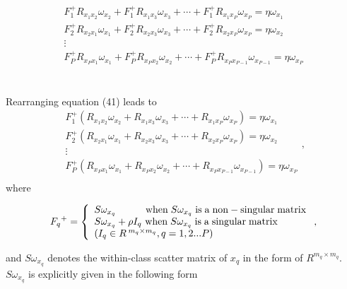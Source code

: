 \documentclass[journal]{IEEEtran}
\begin{document}
\begin{small}
\begin{equation}
\begin{array}{*{20}{c}}
   {F_1^ + {R_{{x_1}{x_2}}}{\omega _{{x_2}}} + F_1^ + {R_{{x_1}{x_3}}}{\omega _{{x_3}}} +  \cdots  + F_1^ + {R_{{x_1}{x_P}}}{\omega _{{x_P}}} = {\eta}{\omega _{{x_1}}}}  \\
   {F_2^ + {R_{{x_2}{x_1}}}{\omega _{{x_1}}} + F_2^ + {R_{{x_2}{x_3}}}{\omega _{{x_3}}} +  \cdots  + F_2^ + {R_{{x_2}{x_P}}}{\omega _{{x_P}}} = {\eta}{\omega _{{x_2}}}}  \\
    \vdots   \\
   {F_P^ + {R_{{x_P}{x_1}}}{\omega _{{x_1}}} + F_P^ + {R_{{x_P}{x_2}}}{\omega _{{x_2}}} +  \cdots  + F_P^ + {R_{{x_P}{x_{P - 1}}}}{\omega _{{x_{P - 1}}}} = {\eta}{\omega _{{x_P}}}}  \\
\end{array}
\end{equation}
\end{small}\\\indent
Rearranging equation (41) leads to
\begin{equation}
\begin{array}{*{20}{c}}
   {F_1^ + ({R_{{x_1}{x_2}}}{\omega _{{x_2}}} + {R_{{x_1}{x_3}}}{\omega _{{x_3}}} +  \cdots  + {R_{{x_1}{x_P}}}{\omega _{{x_P}}}) = {\eta}{\omega _{{x_1}}}}  \\
   {F_2^ + ({R_{{x_2}{x_1}}}{\omega _{{x_1}}} + {R_{{x_2}{x_3}}}{\omega _{{x_3}}} +  \cdots  + {R_{{x_2}{x_P}}}{\omega _{{x_P}}}) = {\eta}{\omega _{{x_2}}}}  \\
    \vdots   \\
   {F_P^ + ({R_{{x_P}{x_1}}}{\omega _{{x_1}}} + {R_{{x_P}{x_2}}}{\omega _{{x_2}}} +  \cdots  + {R_{{x_P}{x_{P - 1}}}}{\omega _{{x_{P - 1}}}}) = {\eta}{\omega _{{x_P}}}}  \\
\end{array},
\end{equation}
where
\begin{small}
\begin{equation}
{F_q}^ +  = \left\{ \begin{array}{l}
 S{\omega _{{x_q}}}\qquad \quad {\rm{when}}\; S{\omega _{{x_q}}}\; {\rm{is}}\; {\rm{a}}\; {\rm{non-singular}}\; {\rm{matrix}} \\
 S{\omega _{{x_q}}} + \rho {I_q}\  {\rm{when}}\; S{\omega _{{x_q}}}\; {\rm{is}}\; {\rm{a}}\; {\rm{singular}}\; {\rm{matrix}} \\
 ({I_q} \in {R^{\:{m_q} \times {m_q}}}, q = 1,2...P) \\
 \end{array} \right.,
\end{equation}
\end{small} and ${S{\omega_{{{x_q}}}}} $ denotes the within-class scatter matrix of $ {{x_q}} $ in the form of $R^{{m_q}\times {m_q}}$. ${S{\omega_{{{x_q}}}}} $ is explicitly given in the following form\\
\end{document}
